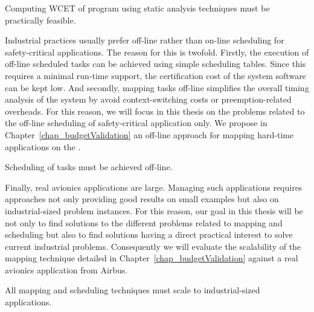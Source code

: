 \documentclass[main.tex]{subfiles}
\begin{document}
\begin{constraint}
    \label{constr_staticAnalysis}
    Computing WCET of program using static analysis techniques must be practically feasible.
\end{constraint}



Industrial practices usually prefer off-line rather than on-line scheduling for safety-critical applications. The reason for this is twofold. Firstly, the execution of off-line scheduled tasks can be achieved using simple scheduling tables. Since this requires a minimal run-time support, the certification cost of the system software can be kept low. And secondly, mapping tasks off-line simplifies the overall timing analysis of the system by avoid context-switching costs or preemption-related overheads. For this reason, we will focus in this thesis on the problems related to the off-line scheduling of safety-critical application only. We propose in Chapter~\ref{chap_budgetValidation} an off-line approach for mapping hard-time applications on the \mppalong.

\begin{constraint}
    \label{constr_schedOffLine}
    Scheduling of tasks must be achieved off-line.
\end{constraint}

Finally, real avionics applications are large. Managing such applications requires approaches not only providing good results on small examples but also on industrial-sized problem instances. For this reason, our goal in this thesis will be not only to find solutions to the different problems related to mapping and scheduling but also to find solutions having a direct practical interest to solve current industrial problems. Consequently we will  evaluate the scalability of the mapping technique detailed in Chapter~\ref{chap_budgetValidation} against a real avionics application from Airbus.

\begin{constraint}
    \label{constr_scalability}
    All mapping and scheduling techniques must scale to industrial-sized applications.
\end{constraint}

\end{document}
